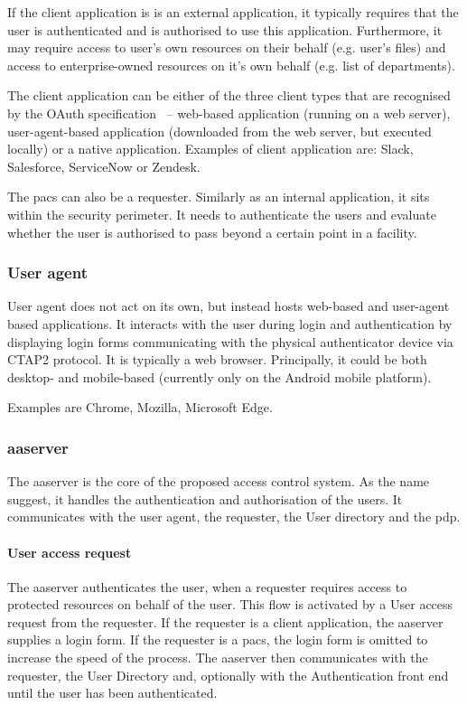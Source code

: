 If the client application is is an external application, it typically requires that the user is authenticated and is authorised to use this application. Furthermore, it may require access to user's own resources on their behalf (e.g. user's files) and access to enterprise-owned resources on it's own behalf (e.g. list of departments).
    
The client application can be either of the three client types that are recognised by the OAuth specification~\cite{Hardt2012TheFramework} -- web-based application (running on a web server), user-agent-based application (downloaded from the web server, but executed locally) or a native application. Examples of client application are: Slack, Salesforce, ServiceNow or Zendesk.

The \acrshort{pacs} can also be a requester. Similarly as an internal application, it sits within the security perimeter. It needs to authenticate the users and evaluate whether the user is authorised to pass beyond a certain point in a facility.

\subsubsection{User agent}
User agent does not act on its own, but instead hosts web-based and user-agent based applications. It interacts with the user during login and authentication by displaying login forms communicating with the physical authenticator device via CTAP2 protocol\footnotemark. It is typically a web browser. Principally, it could be both desktop- and mobile-based (currently only on the Android mobile platform). 
% 

Examples are Chrome, Mozilla, Microsoft Edge.

\subsubsection{\acrlong{aaserver}} 
The \acrfull{aaserver} is the core of the proposed access control system. As the name suggest, it handles the authentication and authorisation of the users. It communicates with the user agent, the requester, the User directory and the \acrshort{pdp}.
    
\paragraph{User access request}
The \acrshort{aaserver} authenticates the user, when a requester requires access to protected resources on behalf of the user. This flow is activated by a User access request from the requester. If the requester is a client application, the \acrshort{aaserver} supplies a login form. If the requester is a \acrshort{pacs}, the login form is omitted to increase the speed of the process. The \acrshort{aaserver} then communicates with the requester, the User Directory and, optionally with the Authentication front end until the user has been authenticated.

